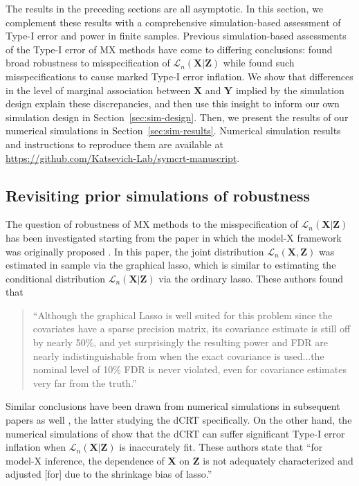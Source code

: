 \documentclass[aos]{imsart}
\theoremstyle{plain}
\theoremstyle{remark}
\newcommand{\prx}{\bm X}								%
\newcommand{\prz}{\bm Z}								%
\newcommand{\pry}{{\bm Y}}								%
\newcommand{\law}{\mathcal L}							%
\begin{document}
The results in the preceding sections are all asymptotic. In this section, we complement these results with a comprehensive simulation-based assessment of Type-I error and power in finite samples. Previous simulation-based assessments of the Type-I error of MX methods have come to differing conclusions: \citet{SetC17, Romano2019a, SetS19, Liu2022a} found broad robustness to misspecification of $\law_n(\prx|\prz)$ while \citet{Li2022} found such misspecifications to cause marked Type-I error inflation. We show that differences in the level of marginal association between $\prx$ and $\pry$ implied by the simulation design explain these discrepancies, and then use this insight to inform our own simulation design in Section~\ref{sec:sim-design}. Then, we present the results of our numerical simulations in Section~\ref{sec:sim-results}. Numerical simulation results and instructions to reproduce them are available at \url{https://github.com/Katsevich-Lab/symcrt-manuscript}.	

\subsection{Revisiting prior simulations of robustness}  \label{sec:sim-revisiting}

The question of robustness of MX methods to the misspecification of $\law_n(\prx|\prz)$ has been investigated starting from the paper in which the model-X framework was originally proposed \citep{CetL16}. In this paper, the joint distribution $\law_n(\prx,\prz)$ was estimated in sample via the graphical lasso, which is similar to estimating the conditional distribution $\law_n(\prx|\prz)$ via the ordinary lasso. These authors found that
\begin{quote}
    ``Although the graphical Lasso is well suited for this problem since the covariates have a sparse precision matrix, its covariance estimate is still off by nearly 50\%, and yet surprisingly the resulting power and FDR are nearly indistinguishable from when the exact covariance is used...the nominal level of 10\% FDR is never violated, even for covariance estimates very far from the truth.''
\end{quote}
Similar conclusions have been drawn from numerical simulations in subsequent papers as well \citep{SetC17, Romano2019a, SetS19, Liu2022a}, the latter studying the dCRT specifically. On the other hand, the numerical simulations of \citet{Li2022} show that the dCRT can suffer significant Type-I error inflation when $\law_n(\prx|\prz)$ is inaccurately fit. These authors state that ``for model-X inference, the dependence of $\prx$ on $\prz$ is not adequately characterized and adjusted [for] due to the shrinkage bias of lasso.''
\end{document}
